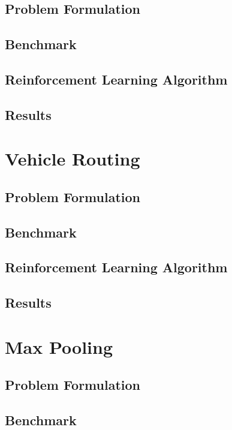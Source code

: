 \documentclass[12pt]{article}
\begin{document}
\subsection{Problem Formulation}

\subsection{Benchmark}

\subsection{Reinforcement Learning Algorithm}

\subsection{Results}

\section{Vehicle Routing}

\subsection{Problem Formulation}

\subsection{Benchmark}

\subsection{Reinforcement Learning Algorithm}

\subsection{Results}

\section{Max Pooling}

\subsection{Problem Formulation}

\subsection{Benchmark}
\end{document}
